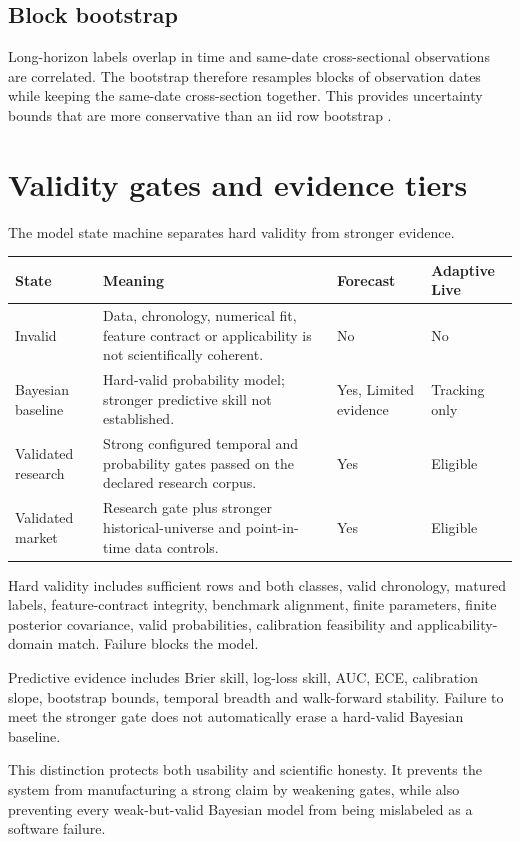 \documentclass[11pt]{article}
\begin{document}
\subsection{Block bootstrap}
Long-horizon labels overlap in time and same-date cross-sectional observations are correlated. The bootstrap therefore resamples blocks of observation dates while keeping the same-date cross-section together. This provides uncertainty bounds that are more conservative than an iid row bootstrap \citep{kunsch1989jackknife,politis1994stationary}.

\section{Validity gates and evidence tiers}
The model state machine separates hard validity from stronger evidence.

\begin{longtable}{p{}p{}p{}p{}}
\toprule
State & Meaning & Forecast & Adaptive Live\\
\midrule
\endhead
Invalid & Data, chronology, numerical fit, feature contract or applicability is not scientifically coherent. & No & No\\
Bayesian baseline & Hard-valid probability model; stronger predictive skill not established. & Yes, Limited evidence & Tracking only\\
Validated research & Strong configured temporal and probability gates passed on the declared research corpus. & Yes & Eligible\\
Validated market & Research gate plus stronger historical-universe and point-in-time data controls. & Yes & Eligible\\
\bottomrule
\end{longtable}

Hard validity includes sufficient rows and both classes, valid chronology, matured labels, feature-contract integrity, benchmark alignment, finite parameters, finite posterior covariance, valid probabilities, calibration feasibility and applicability-domain match. Failure blocks the model.

Predictive evidence includes Brier skill, log-loss skill, AUC, ECE, calibration slope, bootstrap bounds, temporal breadth and walk-forward stability. Failure to meet the stronger gate does not automatically erase a hard-valid Bayesian baseline.

This distinction protects both usability and scientific honesty. It prevents the system from manufacturing a strong claim by weakening gates, while also preventing every weak-but-valid Bayesian model from being mislabeled as a software failure.
\end{document}
